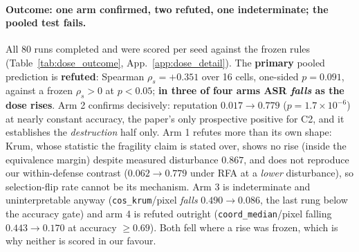 \documentclass{article}
\begin{document}
\paragraph{Outcome: one arm confirmed, two refuted, one indeterminate; the pooled test fails.} All 80 runs completed and were scored per seed against the frozen rules (Table~\ref{tab:dose_outcome}, App.~\ref{app:dose_detail}). The \textbf{primary} pooled prediction is \textbf{refuted}: Spearman $\rho_s = +0.351$ over 16 cells, one-sided $p = 0.091$, against a frozen $\rho_s>0$ at $p<0.05$; \textbf{in three of four arms ASR \emph{falls} as the dose rises}. Arm 2 confirms decisively: reputation $0.017 \to 0.779$ ($p = 1.7{\times}10^{-6}$) at nearly constant accuracy, the paper's only prospective positive for C2, and it establishes the \emph{destruction} half only. Arm 1 refutes more than its own shape: Krum, whose statistic the fragility claim is stated over, shows no rise (inside the equivalence margin) despite measured disturbance $0.867$, and does not reproduce our within-defense contrast ($0.062 \to 0.779$ under RFA at a \emph{lower} disturbance), so selection-flip rate cannot be its mechanism. Arm 3 is indeterminate and uninterpretable anyway (\texttt{cos\_krum}/pixel \emph{falls} $0.490 \to 0.086$, the last rung below the accuracy gate) and arm 4 is refuted outright (\texttt{coord\_median}/pixel falling $0.443 \to 0.170$ at accuracy $\ge 0.69$). Both fell where a rise was frozen, which is why neither is scored in our favour.
\end{document}
